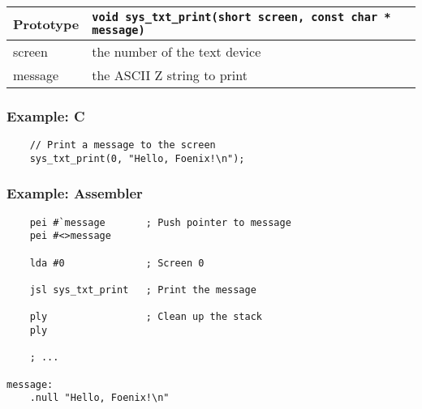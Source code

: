 \begin{tabular}{|l||l|} \hline
Prototype & \lstinline!void sys_txt_print(short screen, const char * message)! \\ \hline
screen & the number of the text device \\ \hline
message & the ASCII Z string to print \\ \hline
\end{tabular}

\subsubsection*{Example: C}
\begin{lstlisting}
    // Print a message to the screen
    sys_txt_print(0, "Hello, Foenix!\n");
\end{lstlisting}

\subsubsection*{Example: Assembler}
\begin{verbatim}
    pei #`message       ; Push pointer to message
    pei #<>message

    lda #0              ; Screen 0

    jsl sys_txt_print   ; Print the message

    ply                 ; Clean up the stack
    ply

    ; ...

message:
    .null "Hello, Foenix!\n"
\end{verbatim}